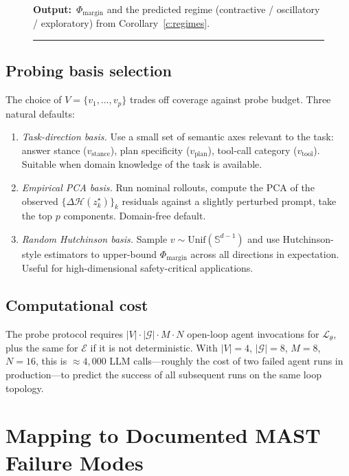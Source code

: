 \documentclass[11pt,a4paper]{article}
\theoremstyle{definition}
\theoremstyle{remark}
\newcommand{\agent}{\mathcal{L}_{\theta}}
\newcommand{\env}{\mathcal{E}}
\newcommand{\obs}{\mathcal{H}}
\newcommand{\PhaseMargin}{\Phi_{\mathrm{margin}}}
\begin{document}
\begin{figure}[t]
\medskip\noindent
\textbf{Output:}\, $\PhaseMargin$ and the predicted regime
(contractive / oscillatory / exploratory) from
Corollary~\ref{c:regimes}.
\vspace{4pt}\hrule
\end{figure}

\subsection{Probing basis selection}\label{ssec:basis-choice}

The choice of $V=\{v_{1},\dots,v_{p}\}$ trades off coverage against probe
budget.  Three natural defaults:
\begin{enumerate}[leftmargin=*]
\item \emph{Task-direction basis.}  Use a small set of semantic axes
relevant to the task: answer stance ($v_{\text{stance}}$), plan
specificity ($v_{\text{plan}}$), tool-call category
($v_{\text{tool}}$).  Suitable when domain knowledge of the task is
available.
\item \emph{Empirical PCA basis.}  Run nominal rollouts, compute the
PCA of the observed $\{\Delta\obs(z_{k}^{\star})\}_{k}$ residuals against
a slightly perturbed prompt, take the top $p$ components.  Domain-free
default.
\item \emph{Random Hutchinson basis.}  Sample $v\sim\mathrm{Unif}(\mathbb{S}^{d-1})$ and use Hutchinson-style estimators to
upper-bound $\PhaseMargin$ across all directions in expectation.  Useful
for high-dimensional safety-critical applications.
\end{enumerate}

\subsection{Computational cost}\label{ssec:cost}

The probe protocol requires
$|V|\cdot|\mathcal{G}|\cdot M\cdot N$ open-loop agent invocations for
$\agent$, plus the same for $\env$ if it is not deterministic.  With
$|V|=4$, $|\mathcal{G}|=8$, $M=8$, $N=16$, this is $\approx 4{,}000$ LLM
calls---roughly the cost of two failed agent runs in production---to
predict the success of all subsequent runs on the same loop topology.

\section{Mapping to Documented MAST Failure Modes}\label{sec:mast-mapping}
\end{document}
